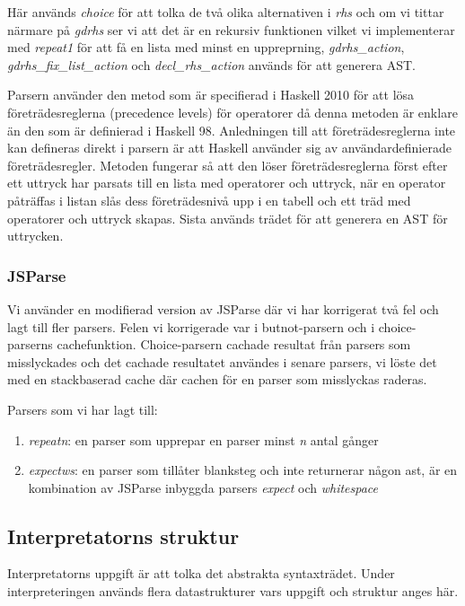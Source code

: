 Här används \emph{choice} för att tolka de två olika alternativen i \emph{rhs} och om vi tittar närmare på \emph{gdrhs} 
ser vi att det är en rekursiv funktionen vilket vi implementerar med \emph{repeat1} för att få en lista med minst en uppreprning, 
\emph{gdrhs\_action}, \emph{gdrhs\_fix\_list\_action} och \emph{decl\_rhs\_action} används för att generera AST.

Parsern använder den metod som är specifierad i Haskell 2010 \citep{haskell2010} för att lösa företrädesreglerna (precedence levels) för operatorer då denna metoden är enklare än den som är definierad i Haskell 98. 
Anledningen till att företrädesreglerna inte kan defineras direkt i parsern är att Haskell använder sig av användardefinierade företrädesregler.
Metoden fungerar så att den löser företrädesreglerna först efter ett uttryck har parsats till en lista med operatorer 
och uttryck, när en operator påträffas i listan slås dess företrädesnivå upp i en tabell och ett träd med 
operatorer och uttryck skapas. Sista används trädet för att generera en AST för uttrycken.

\subsubsection{JSParse}
Vi använder en modifierad version av JSParse där vi har korrigerat två fel och lagt till fler parsers. Felen vi korrigerade var i butnot-parsern och i choice-parserns cachefunktion. 
Choice-parsern cachade resultat från parsers som misslyckades och det cachade resultatet användes i senare parsers, 
vi löste det med en stackbaserad cache där cachen för en parser som misslyckas raderas.

Parsers som vi har lagt till:
\begin{enumerate}
    \item{\emph{repeatn}: en parser som upprepar en parser minst \emph{n} antal gånger}
    \item{\emph{expectws}: en parser som tillåter blanksteg och inte returnerar någon ast, är en kombination av JSParse inbyggda parsers \emph{expect} och \emph{whitespace}}
\end{enumerate}



\subsection{Interpretatorns struktur}
Interpretatorns uppgift är att tolka det abstrakta syntaxträdet. Under interpreteringen används flera datastrukturer vars uppgift och struktur anges här.


